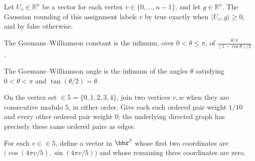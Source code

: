 \begin{definition}
\label{BooleanAnalysis.GaussianSpace.MaxCut.gaussianRounding}
\leanok
Let $U_v\in\mathbb{R}^n$ be a vector for each vertex $v\in\{0,\ldots,n-1\}$, and
let $g\in\mathbb{R}^n$. The Gaussian rounding of this assignment labels $v$ by true
exactly when $\langle U_v,g\rangle\ge 0$, and by false otherwise.
\end{definition}

\begin{definition}
\label{BooleanAnalysis.GaussianSpace.MaxCut.gwConstant}
\leanok
The Goemans–Williamson constant is the infimum, over $0<\theta\le\pi$, of
$\displaystyle\frac{\theta/\pi}{(1-\cos\theta)/2}$.
\end{definition}

\begin{definition}
\label{BooleanAnalysis.GaussianSpace.MaxCut.gwAngle}
\leanok
The Goemans–Williamson angle is the infimum of the angles $\theta$ satisfying
$0<\theta<\pi$ and $\tan(\theta/2)=\theta$.
\end{definition}

\begin{definition}
\label{BooleanAnalysis.GaussianSpace.MaxCut.fiveCycle}
\leanok
{}
On the vertex set $\in 5=\{0,1,2,3,4\}$, join two vertices $v,w$ when they are consecutive
modulo $5$, in either order. Give each such ordered pair weight $1/10$ and every other
ordered pair weight $0$; the underlying directed graph has precisely these same ordered
pairs as edges.
\end{definition}

\begin{definition}
\label{BooleanAnalysis.GaussianSpace.MaxCut.fiveCycleSDP}
\leanok
For each $v\in\in 5$, define a vector in $\bbr^5$ whose first two coordinates are
$\bigl(\cos(4\pi v/5),\sin(4\pi v/5)\bigr)$ and whose remaining three coordinates are
zero.
\end{definition}
